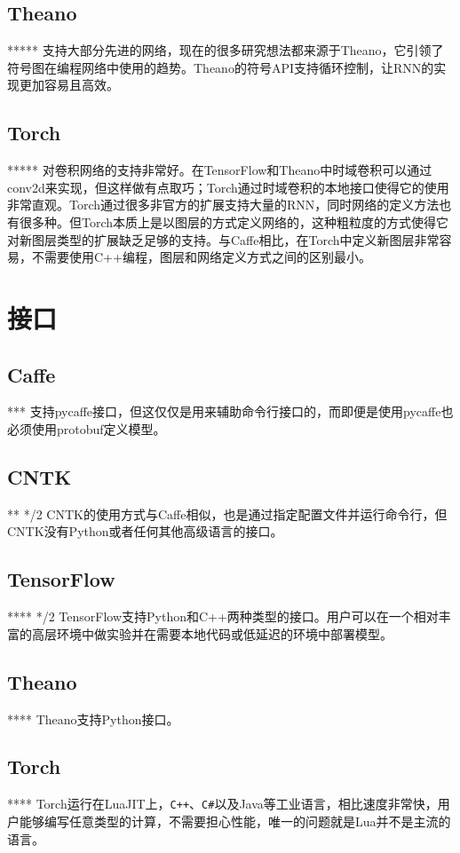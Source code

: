 \subsection{Theano}
*****
支持大部分先进的网络，现在的很多研究想法都来源于Theano，它引领了符号图在编程网络中使用的趋势。Theano的符号API支持循环控制，让RNN的实现更加容易且高效。

\subsection{Torch}
*****
对卷积网络的支持非常好。在TensorFlow和Theano中时域卷积可以通过conv2d来实现，但这样做有点取巧；Torch通过时域卷积的本地接口使得它的使用非常直观。Torch通过很多非官方的扩展支持大量的RNN，同时网络的定义方法也有很多种。但Torch本质上是以图层的方式定义网络的，这种粗粒度的方式使得它对新图层类型的扩展缺乏足够的支持。与Caffe相比，在Torch中定义新图层非常容易，不需要使用C++编程，图层和网络定义方式之间的区别最小。

\section{接口}
\subsection{Caffe}*** 支持pycaffe接口，但这仅仅是用来辅助命令行接口的，而即便是使用pycaffe也必须使用protobuf定义模型。
\subsection{CNTK}** */2
CNTK的使用方式与Caffe相似，也是通过指定配置文件并运行命令行，但CNTK没有Python或者任何其他高级语言的接口。
\subsection{TensorFlow}**** */2
TensorFlow支持Python和C++两种类型的接口。用户可以在一个相对丰富的高层环境中做实验并在需要本地代码或低延迟的环境中部署模型。
\subsection{Theano}****
Theano支持Python接口。
\subsection{Torch}****
Torch运行在LuaJIT上，\verb|C++|、\verb|C#|以及Java等工业语言，相比速度非常快，用户能够编写任意类型的计算，不需要担心性能，唯一的问题就是Lua并不是主流的语言。


